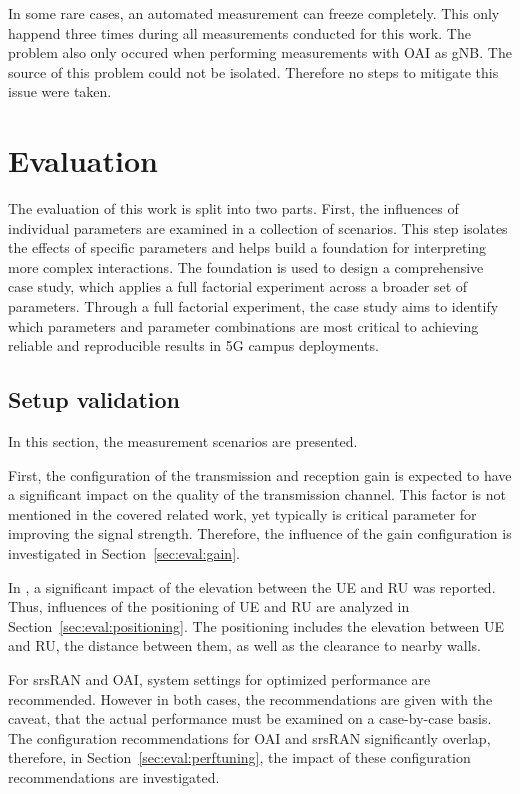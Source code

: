 In some rare cases, an automated measurement can freeze completely.
This only happend three times during all measurements conducted for this work.
The problem also only occured when performing measurements with OAI as \gls{gNB}.
The source of this problem could not be isolated.
Therefore no steps to mitigate this issue were taken.




\chapter{Evaluation}\label{chap:evaluation}

The evaluation of this work is split into two parts.
First, the influences of individual parameters are examined in a collection of scenarios.
This step isolates the effects of specific parameters and helps build a foundation for interpreting more complex interactions.
The foundation is used to design a comprehensive case study, which applies a full factorial experiment across a broader set of parameters.
Through a full factorial experiment, the case study aims to identify which parameters and parameter combinations
are most critical to achieving reliable and reproducible results in 5G campus deployments.



\section{Setup validation}\label{sec:eval:validation}
In this section, the measurement scenarios are presented.

First, the configuration of the transmission and reception gain is expected to have a significant impact on the
quality of the transmission channel.
This factor is not mentioned in the covered related work, yet typically is critical parameter for improving the signal strength.
Therefore, the influence of the gain configuration is investigated in Section~\ref{sec:eval:gain}.

In \cite{raffeck2024parameterizing}, a significant impact of the elevation between the \gls{UE} and \gls{RU} was reported.
Thus, influences of the positioning of \gls{UE} and \gls{RU} are analyzed in Section~\ref{sec:eval:positioning}.
The positioning includes the elevation between \gls{UE} and \gls{RU}, the distance between them, as well as
the clearance to nearby walls.

For srsRAN and OAI, system settings for optimized performance are recommended.
However in both cases, the recommendations are given with the caveat, that the actual performance must be examined on a
case-by-case basis.
The configuration recommendations for OAI and srsRAN significantly overlap, therefore, in
Section~\ref{sec:eval:perftuning}, the impact of these configuration recommendations are investigated.

